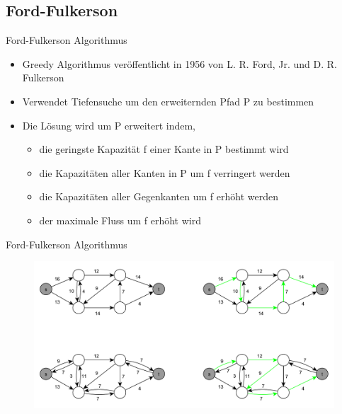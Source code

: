 \documentclass[18pt]{beamer}
\begin{document}
\subsection{Ford-Fulkerson}
\begin{frame}{Ford-Fulkerson Algorithmus}
\begin{itemize}
	\item Greedy Algorithmus ver\"offentlicht in 1956 von L. R. Ford, Jr. und D. R. Fulkerson
	\item Verwendet Tiefensuche um den erweiternden Pfad P zu bestimmen
	\item Die L\"osung wird um P erweitert indem, 
	\begin{itemize}
		\item die geringste Kapazit\"at f einer Kante in P bestimmt wird
		\item die Kapazit\"aten aller Kanten in P um f verringert werden
		\item die Kapazit\"aten aller Gegenkanten um f erh\"oht werden
		\item der maximale Fluss um f erh\"oht wird
	\end{itemize}  
\end{itemize}
\end{frame}

\begin{frame}{Ford-Fulkerson Algorithmus}
\begin{figure}
\includegraphics[width = \textwidth]{img/Jakob_Ford.pdf}
\end{figure}
\end{frame}
\end{document}

